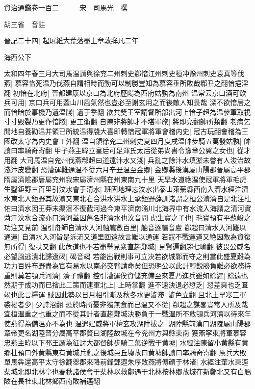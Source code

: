 資治通鑑卷一百二　　　宋　司馬光　撰

胡三省　音註

晉記二十四|{
	起屠維大荒落盡上章敦牂凡二年}


海西公下

太和四年春三月大司馬温請與徐兖二州刺史郗愔江州刺史桓冲豫州刺史袁真等伐燕|{
	慕容恪死温乃伐燕自謂相時而動可以制勝豈知為慕容垂所敗哉郗丑之翻愔挹淫翻}
初愔在北府|{
	晉都建康以京口為北府歷陽為西府姑孰為南州}
温常云京口酒可飲兵可用|{
	京口兵可用蓋山川風氣然也豈必至謝玄用之而後敵人知畏哉}
深不欲愔居之而愔暗於事機乃遺温牋|{
	遺于季翻}
欲共奬王室請督所部出河上愔子超為温參軍取視寸寸毁裂乃更作愔牋|{
	更工衡翻}
自陳非將帥才不堪軍旅|{
	將即亮翻帥所類翻}
老病乞閒地自養勸温并領已所統温得牋大喜即轉愔冠軍將軍會稽内史|{
	冠古玩翻會稽為王國改太守為内史會工外翻}
温自領徐兖二州刺史夏四月庚戌温帥步騎五萬發姑孰|{
	帥讀曰率騎奇寄翻}
甲子燕主暐立皇后可足渾氏太后從弟尚書令豫章公翼之女也|{
	從才用翻}
大司馬温自兖州伐燕郗超曰道遠汴水又淺|{
	兵亂之餘汴水填淤未嘗有人浚治故淺汴皮變翻}
恐漕運難通温不從六月辛丑温至金鄉|{
	金鄉縣後漢屬山陽郡晉屬高平郡隋屬濟隂郡唐屬兖州我宋屬濟州縣在州東南九十里}
天旱水道絶温使冠軍將軍毛虎生鑿鉅野三百里引汶水會于清水|{
	班固地理志汶水出泰山萊蕪縣西南入濟水經注濟水東北入鉅野其故瀆又東北右合洪水洪水上承鉅野薛訓渚謂之桓公瀆濟自是北注杜佑曰濟水因王莽末渠涸不復截河過今東平濟南淄川北海界中有水流入海謂之清河實菏澤汶水合流亦曰濟河蓋因舊名非濟水也汶音問}
虎生寶之子也|{
	毛寶預有平蘇峻之功注又見前}
温引舟師自清水入河舳艫數百里|{
	舳音逐艫音盧}
郗超曰清水入河難以通運|{
	自清水入河皆是泝流又道里回遠故言難以通運}
若寇不戰運道又絶因敵為資復無所得|{
	復扶又翻}
此危道也不若盡舉見衆直趨鄴城|{
	見賢遍翻趨七喻翻}
彼畏公威名必望風逃潰北歸遼碣|{
	碣音竭}
若能出戰則事可立決若欲城鄴而守之則當此盛夏難為功力百姓布野盡為官有易水以南必交臂請命矣但恐明公以此計輕鋭勝負難必欲務持重則莫若頓兵河濟|{
	濟子禮翻}
控引漕運俟資儲充備至來夏乃進兵雖如賖遲|{
	賖遠也}
然期于成功而已捨此二策而連軍北上|{
	上時掌翻}
進不速決退必愆乏|{
	愆差爽也乏匱竭也此言糧運}
賊因此勢以日月相引漸及秋冬水更澁滯|{
	澁色立翻}
且北土早寒三軍裘褐者少|{
	少詩沼翻}
恐於時所憂非獨無食而已温又不從|{
	郗超之謀畧豈常人所及哉宜桓温重之也重之而不從其計者直趨鄴城決勝負于一戰温所不敢頓兵河濟以待來年使燕得為備温亦不為也}
温遣建威將軍檀玄攻湖陸拔之|{
	湖陸縣前漢曰湖陵屬山陽郡章帝更名湖陸晉分屬高平郡賢曰湖陸故城在今兖州方與縣東南}
獲燕寜東將軍慕容忠燕主暐以下邳王厲為征討大都督帥步騎二萬逆戰于黄墟|{
	水經注陳留小黄縣有黄鄉杜預曰外黄縣東有黄城兵亂之後城邑丘墟故曰黄墟帥讀曰率騎奇寄翻}
厲兵大敗單馬犇還高平太守徐翻舉郡來降前鋒鄧遐朱序敗燕將傅顔于林渚|{
	水經注華水東逕棐城北即北林亭也春秋諸侯會于棐林以救鄭遇于北林按林鄉故城在新鄭北又有白鴈陂在長社東北林鄉西南敗補邁翻}
